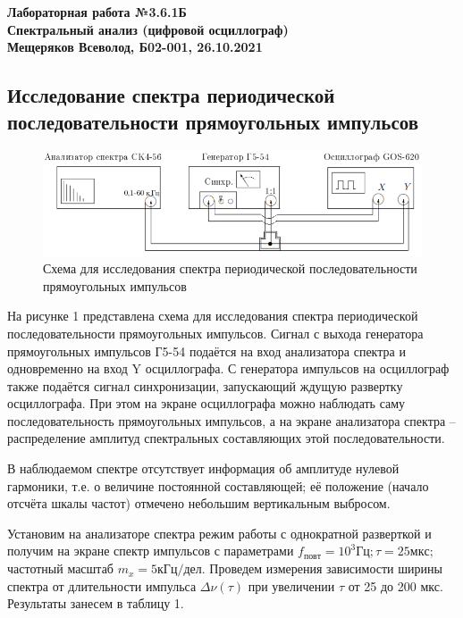 \documentclass[a4paper, fontsize = 14pt]{article}
\begin{document}
\begin{center} \textbf{
Лабораторная работа №3.6.1Б \\ Спектральный анализ (цифровой осциллограф) \\ 
Мещеряков Всеволод, Б02-001, 26.10.2021}
\end{center} 

\subsection*{Исследование спектра периодической последовательности прямоугольных импульсов}

\begin{figure}[hbt]
	\centering
	\includegraphics[scale=0.9]{lab361ris1.png}
	\caption{Схема для исследования спектра периодической последовательности прямоугольных импульсов}
\end{figure}

На рисунке 1 представлена схема для исследования спектра периодической последовательности прямоугольных импульсов. Сигнал с выхода генератора прямоугольных импульсов Г5-54 подаётся на вход анализатора спектра и одновременно на вход Y осциллографа. С генератора импульсов на осциллограф также подаётся сигнал синхронизации, запускающий ждущую развертку осциллографа. При этом на экране осциллографа можно наблюдать саму последовательность прямоугольных импульсов, а на экране анализатора спектра -- распределение амплитуд спектральных составляющих этой последовательности.

В наблюдаемом спектре отсутствует информация об амплитуде нулевой гармоники, т.е. о величине постоянной составляющей; её положение (начало отсчёта шкалы частот) отмечено небольшим вертикальным выбросом.

Установим на анализаторе спектра режим работы с однократной разверткой и получим на экране спектр импульсов с параметрами $f_{повт} = 10^3 Гц; \tau = 25 мкс;$ частотный масштаб $m_x = 5кГц/дел$. Проведем измерения зависимости ширины спектра от длительности импульса $\Delta \nu(\tau)$ при увеличении $\tau$ от 25 до 200 мкс. Результаты занесем в таблицу 1.
\end{document}
